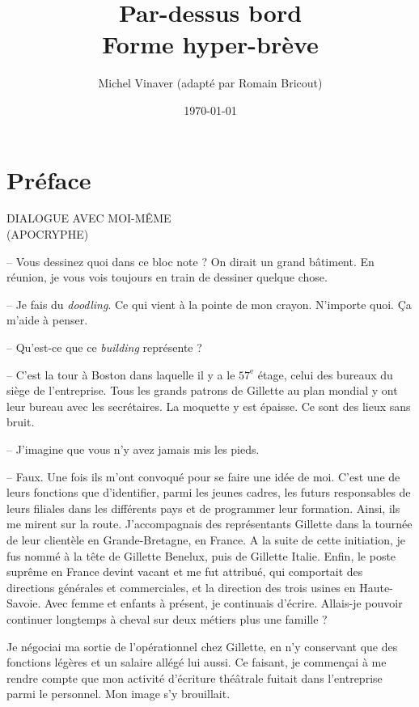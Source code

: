 \documentclass[a4paper]{report}
\title{Par-dessus bord\\\large Forme hyper-brève}
\author{Michel Vinaver (adapté par Romain Bricout)}
\date{\today}
\begin{document}

\maketitle

\renewcommand{\contentsname}{Sommaire}
\dominitoc\tableofcontents

\chapter*{Préface}

\begin{center}
DIALOGUE AVEC MOI-MÊME\\(APOCRYPHE)
\end{center}

-- Vous dessinez quoi dans ce bloc note ? On dirait un grand bâtiment. En réunion, je vous vois toujours en train de dessiner quelque chose.

-- Je fais du \textit{doodling}. Ce qui vient à la pointe de mon crayon. N'importe quoi. Ça m'aide à penser.

-- Qu'est-ce que ce \textit{building} représente ?

-- C'est la tour à Boston dans laquelle il y a le \(57^{\text{e}}\) étage, celui des bureaux du siège de l'entreprise. Tous les grands patrons de Gillette au plan mondial y ont leur bureau avec les secrétaires. La moquette y est épaisse. Ce sont des lieux sans bruit.

-- J'imagine que vous n'y avez jamais mis les pieds.

-- Faux. Une fois ils m'ont convoqué pour se faire une idée de moi. C'est une de leurs fonctions que d'identifier, parmi les jeunes cadres, les futurs responsables de leurs filiales dans les différents pays et de programmer leur formation. Ainsi, ils me mirent sur la route. J'accompagnais des représentants Gillette dans la tournée de leur clientèle en Grande-Bretagne, en France. A la suite de cette initiation, je fus nommé à la tête de Gillette Benelux, puis de Gillette Italie. Enfin, le poste suprême en France devint vacant et me fut attribué, qui comportait des directions générales et commerciales, et la direction des trois usines en Haute-Savoie. Avec femme et enfants à présent, je continuais d'écrire. Allais-je pouvoir continuer longtemps à cheval sur deux métiers plus une famille ?

Je négociai ma sortie de l'opérationnel chez Gillette, en n'y conservant que des fonctions légères et un salaire allégé lui aussi. Ce faisant, je commençai à me rendre compte que mon activité d'écriture théâtrale fuitait dans l'entreprise parmi le personnel. Mon image s'y brouillait.
\end{document}
